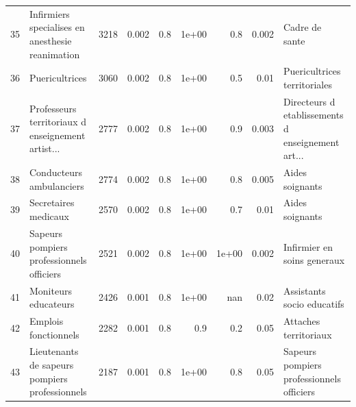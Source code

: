 \documentclass[11pt,a4paper]{article}
\begin{document}
\begin{tabular}{llrrrrrrl}
	35  &   Infirmiers specialises en anesthesie reanimation &           3218 &          0.002 &                    0.8 &              1e+00 &                               0.8 &                                    0.002 &                                     Cadre de sante \\
	36  &                                     Puericultrices &           3060 &          0.002 &                    0.8 &              1e+00 &                               0.5 &                                     0.01 &                       Puericultrices territoriales \\
	37  &  Professeurs territoriaux d enseignement artist... &           2777 &          0.002 &                    0.8 &              1e+00 &                               0.9 &                                    0.003 &  Directeurs d etablissements d enseignement art... \\
	38  &                           Conducteurs ambulanciers &           2774 &          0.002 &                    0.8 &              1e+00 &                               0.8 &                                    0.005 &                                    Aides soignants \\
	39  &                               Secretaires medicaux &           2570 &          0.002 &                    0.8 &              1e+00 &                               0.7 &                                     0.01 &                                    Aides soignants \\
	40  &          Sapeurs pompiers professionnels officiers &           2521 &          0.002 &                    0.8 &              1e+00 &                             1e+00 &                                    0.002 &                        Infirmier en soins generaux \\
	41  &                               Moniteurs educateurs &           2426 &          0.001 &                    0.8 &              1e+00 &                               nan &                                     0.02 &                         Assistants socio educatifs \\
	42  &                               Emplois fonctionnels &           2282 &          0.001 &                    0.8 &                0.9 &                               0.2 &                                     0.05 &                              Attaches territoriaux \\
	43  &     Lieutenants de sapeurs pompiers professionnels &           2187 &          0.001 &                    0.8 &              1e+00 &                               0.8 &                                     0.05 &          Sapeurs pompiers professionnels officiers \\

\end{tabular}
\end{document}
